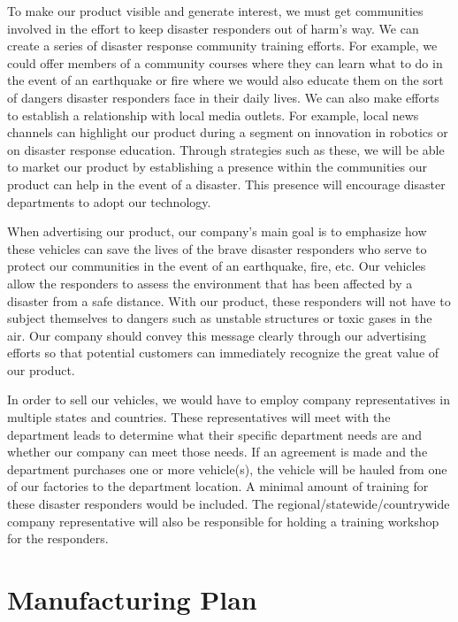 To make our product visible and generate interest, we must get communities involved in the effort to keep disaster responders out of harm's way. We can create a series of disaster response community training efforts. For example, we could offer members of a community courses where they can learn what to do in the event of an earthquake or fire where we would also educate them on the sort of dangers disaster responders face in their daily lives. We can also make efforts to establish a relationship with local media outlets. For example, local news channels can highlight our product during a segment on innovation in robotics or on disaster response education. Through strategies such as these, we will be able to market our product by establishing a presence within the communities our product can help in the event of a disaster. This presence will encourage disaster departments to adopt our technology. 

When advertising our product, our company's main goal is to emphasize how these vehicles can save the lives of the brave disaster responders who serve to protect our communities in the event of an earthquake, fire, etc. Our vehicles allow the responders to assess the environment that has been affected by a disaster from a safe distance. With our product, these responders will not have to subject themselves to dangers such as unstable structures or toxic gases in the air. Our company should convey this message clearly through our advertising efforts so that potential customers can immediately recognize the great value of our product. 

In order to sell our vehicles, we would have to employ company representatives in multiple states and countries. These representatives will meet with the department leads to determine what their specific department needs are and whether our company can meet those needs. If an agreement is made and the department purchases one or more vehicle(s), the vehicle will be hauled from one of our factories to the department location. A minimal amount of training for these disaster responders would be included. The regional/statewide/countrywide company representative will also be responsible for holding a training workshop for the responders. 

\section{Manufacturing Plan}

